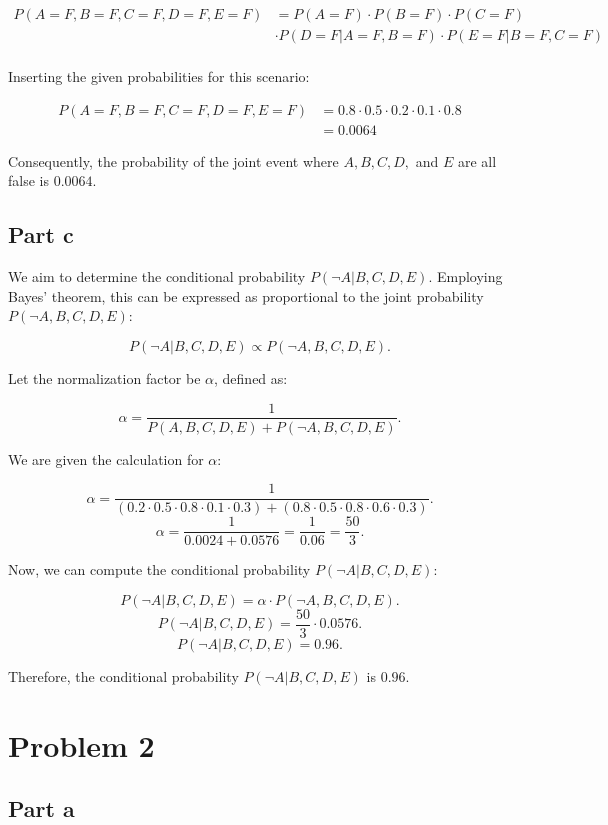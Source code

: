 \documentclass[12pt]{article}
\begin{document}
\begin{align*}
P(A=F, B=F, C=F, D=F, E=F) &= P(A=F) \cdot P(B=F) \cdot P(C=F) \\
& \cdot  P(D=F|A=F, B=F) \cdot P(E=F|B=F, C=F) \\
\end{align*}

Inserting the given probabilities for this scenario:

\begin{align*}
P(A=F, B=F, C=F, D=F, E=F) &= 0.8 \cdot 0.5 \cdot 0.2 \cdot 0.1 \cdot 0.8 \\
&= 0.0064
\end{align*}

Consequently, 
the probability of the joint event where $A, B, C, D,$ 
and $E$ are all false is $\boxed{0.0064}$.

\subsection{Part c}

We aim to determine the conditional probability 
$P(\neg A | B, C, D, E)$. 
Employing Bayes' theorem, 
this can be expressed as proportional to the joint probability 
$P(\neg A, B, C, D, E)$:

$$P(\neg A | B, C, D, E) \propto P(\neg A, B, C, D, E).$$

Let the normalization factor be $\alpha$, 
defined as:

$$\alpha = \frac{1}{P(A, B, C, D, E) + P(\neg A, B, C, D, E)}.$$

We are given the calculation for $\alpha$:

$$\alpha = \frac{1}{(0.2 \cdot 0.5 \cdot 0.8 \cdot 0.1 \cdot 0.3) + (0.8 \cdot 0.5 \cdot 0.8 \cdot 0.6 \cdot 0.3)}.$$
$$\alpha = \frac{1}{0.0024 + 0.0576} = \frac{1}{0.06} = \frac{50}{3}.$$

Now, we can compute the conditional probability $P(\neg A | B, C, D, E)$:

$$P(\neg A | B, C, D, E) = \alpha \cdot P(\neg A, B, C, D, E).$$
$$P(\neg A | B, C, D, E) = \frac{50}{3} \cdot 0.0576.$$
$$P(\neg A | B, C, D, E) = 0.96.$$

Therefore, 
the conditional probability $P(\neg A | B, C, D, E)$ is $\boxed{0.96}$.

\section{Problem 2}

\subsection{Part a}
\end{document}
